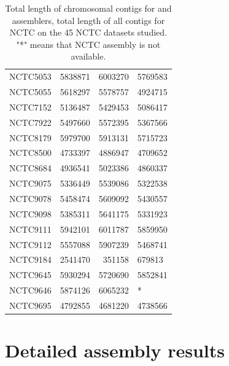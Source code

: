 \documentclass[./main.tex]{subfiles}
\begin{document}
\begin{table}[!htbp]
\begin{tabular}{l|rrl}
NCTC5053 & 5838871 & 6003270 & 5769583 \\
NCTC5055 & 5618297 & 5578757 & 4924715 \\
NCTC7152 & 5136487 & 5429453 & 5086417 \\
NCTC7922 & 5497660 & 5572395 & 5367566 \\
NCTC8179 & 5979700 & 5913131 & 5715723 \\
NCTC8500 & 4733397 & 4886947 & 4709652 \\
NCTC8684 & 4936541 & 5023386 & 4860337 \\
NCTC9075 & 5336449 & 5539086 & 5322538 \\
NCTC9078 & 5458474 & 5609092 & 5430557 \\
NCTC9098 & 5385311 & 5641175 & 5331923 \\
NCTC9111 & 5942101 & 6011787 & 5859950 \\
NCTC9112 & 5557088 & 5907239 & 5468741 \\
NCTC9184 & 2541470 & 351158 & 679813 \\
NCTC9645 & 5930294 & 5720690 & 5852841 \\
NCTC9646 & 5874126 & 6065232 & * \\
NCTC9695 & 4792855 & 4681220 & 4738566 \\
\hline
\end{tabular}
\caption{Total length of chromosomal contigs for \canu and \miniasm assemblers, total length of all contigs for NCTC on the 45 NCTC datasets studied. "*" means that NCTC assembly is not available.}
\label{tb:appendix:genomic_lengths}
\end{table}
\newpage

\section{Detailed assembly results}
\end{document}
